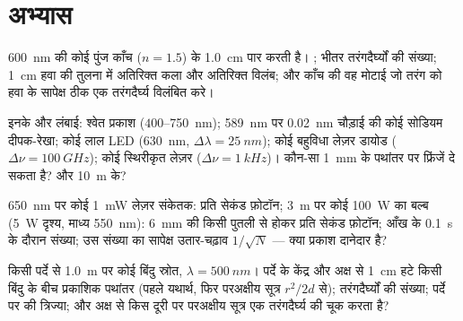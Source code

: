\section{अभ्यास}

\begin{exercise}[$\star$]\label{exo:b2:scalar-light-model:1}
\qty{600}{nm} की कोई पुंज काँच ($n = 1.5$) के \qty{1.0}{cm} पार करती है। ; भीतर तरंगदैर्घ्यों की संख्या; \qty{1}{cm} हवा की तुलना में अतिरिक्त कला और
अतिरिक्त विलंब; और काँच की वह मोटाई जो तरंग को हवा के सापेक्ष
ठीक एक तरंगदैर्घ्य विलंबित करे।
\end{exercise}

\begin{exercise}[$\star$]\label{exo:b2:scalar-light-model:2}
इनके  और लंबाई: श्वेत प्रकाश ($400$--\qty{750}{nm}); \qty{589}{nm} पर
\qty{0.02}{nm} चौड़ाई की कोई सोडियम दीपक-रेखा; कोई लाल LED (\qty{630}{nm},
$\Delta\lambda = \qty{25}{nm}$); कोई बहुविधा लेज़र डायोड ($\Delta\nu = \qty{100}{GHz}$); कोई
स्थिरीकृत लेज़र ($\Delta\nu = \qty{1}{kHz}$)। कौन-सा \qty{1}{mm} के पथांतर पर फ्रिंजें दे
सकता है? और \qty{10}{m} के?
\end{exercise}

\begin{exercise}[$\star$]\label{exo:b2:scalar-light-model:3}
\qty{650}{nm} पर कोई \qty{1}{mW} लेज़र संकेतक: प्रति सेकंड फ़ोटॉन; \qty{3}{m} पर कोई
\qty{100}{W} का बल्ब (\qty{5}{W} दृश्य, माध्य \qty{550}{nm}): \qty{6}{mm} की किसी पुतली से
होकर प्रति सेकंड फ़ोटॉन; आँख के \qty{0.1}{s} के दौरान संख्या;
उस संख्या का सापेक्ष उतार-चढ़ाव $1/\sqrt N$ --- क्या प्रकाश दानेदार है?
\end{exercise}

\begin{exercise}[$\star$]\label{exo:b2:scalar-light-model:4}
किसी पर्दे से \qty{1.0}{m} पर कोई बिंदु स्रोत, $\lambda = \qty{500}{nm}$। पर्दे के केंद्र और
अक्ष से \qty{1}{cm} हटे किसी बिंदु के बीच प्रकाशिक
पथांतर (पहले यथार्थ, फिर परअक्षीय सूत्र $r^2/2d$ से); तरंगदैर्घ्यों की
संख्या; पर्दे पर  की त्रिज्या; और अक्ष से किस दूरी पर
परअक्षीय सूत्र एक तरंगदैर्घ्य की चूक करता है?
\end{exercise}

